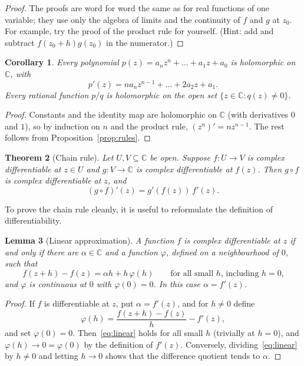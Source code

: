 \documentclass[11pt]{article}
\theoremstyle{plain}
\newtheorem{theorem}{Theorem}[section]
\newtheorem{lemma}[theorem]{Lemma}
\newtheorem{corollary}[theorem]{Corollary}
\theoremstyle{definition}
\theoremstyle{remark}
\numberwithin{equation}{section}
\newcommand{\be}{\begin{equation}}
\newcommand{\ee}{\end{equation}}
\newcommand{\C}{\mathbb{C}}
\begin{document}
\begin{proof}
The proofs are word for word the same as for real functions of one
variable; they use only the algebra of limits and the continuity of $f$
and $g$ at $z_0$.
For example, try the proof of the product rule for yourself. (Hint: add and subtract
$f(z_0+h)g(z_0)$ in the numerator.)
\end{proof}

\begin{corollary}\label{cor:poly}
Every polynomial $p(z)=a_nz^n+\dots+a_1z+a_0$ is holomorphic on $\C$,
with
\be
  p'(z)=na_nz^{n-1}+\dots+2a_2z+a_1.
\ee
Every rational function $p/q$ is holomorphic on the open set
$\{z\in\C: q(z)\ne0\}$.
\end{corollary}

\begin{proof}
Constants and the identity map are holomorphic on $\C$ (with derivatives
$0$ and $1$), so by induction on $n$ and the product rule,
$(z^n)'=nz^{n-1}$.  The rest follows from
Proposition~\ref{prop:rules}.
\end{proof}

\begin{theorem}[Chain rule]\label{thm:chain}
Let $U,V\subseteq\C$ be open.  Suppose $f:U\to V$ is complex
differentiable at $z\in U$ and $g:V\to\C$ is complex differentiable at
$f(z)$.  Then $g\circ f$ is complex differentiable at $z$, and
\be
  (g\circ f)'(z)=g'(f(z))\,f'(z).
\ee
\end{theorem}

To prove the chain rule cleanly, it is useful to reformulate the
definition of differentiability.

\begin{lemma}[Linear approximation]\label{lem:linear}
A function $f$ is complex differentiable at $z$ if and only if there are
$\alpha\in\C$ and a function $\varphi$, defined on a neighbourhood of
$0$, such that
\be\label{eq:linear}
  f(z+h)-f(z)=\alpha h+h\,\varphi(h)
  \qquad\text{for all small $h$, including $h=0$,}
\ee
and $\varphi$ is continuous at $0$ with $\varphi(0)=0$.  In this case
$\alpha=f'(z)$.
\end{lemma}

\begin{proof}
If $f$ is differentiable at $z$, put $\alpha=f'(z)$, and for $h\ne0$
define
\be
  \varphi(h)=\frac{f(z+h)-f(z)}{h}-f'(z),
\ee
and set $\varphi(0)=0$.  Then~\eqref{eq:linear} holds for all small $h$
(trivially at $h=0$), and $\varphi(h)\to0=\varphi(0)$ by the definition
of $f'(z)$.  Conversely, dividing~\eqref{eq:linear} by $h\ne0$ and
letting $h\to0$ shows that the difference quotient tends to $\alpha$.
\end{proof}
\end{document}
